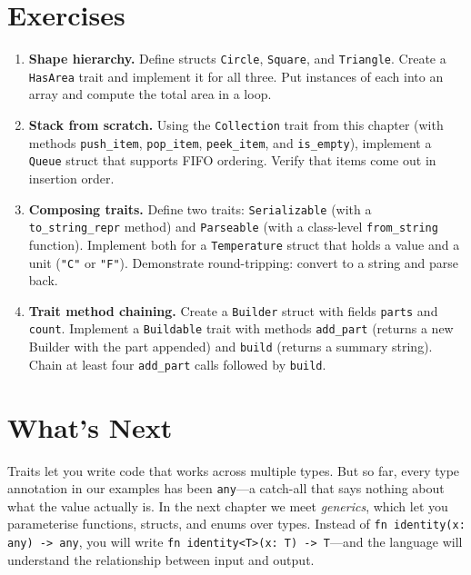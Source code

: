 \section{Exercises}\label{sec:trait-exercises}

\begin{enumerate}
  \item \textbf{Shape hierarchy.}
    Define structs \lstinline|Circle|, \lstinline|Square|, and
    \lstinline|Triangle|. Create a \lstinline|HasArea| trait and implement
    it for all three. Put instances of each into an array and compute the
    total area in a loop.

  \item \textbf{Stack from scratch.}
    Using the \lstinline|Collection| trait from this chapter (with methods
    \lstinline|push_item|, \lstinline|pop_item|, \lstinline|peek_item|,
    and \lstinline|is_empty|), implement a \lstinline|Queue| struct that
    supports FIFO ordering. Verify that items come out in insertion order.

  \item \textbf{Composing traits.}
    Define two traits: \lstinline|Serializable| (with a
    \lstinline|to_string_repr| method) and \lstinline|Parseable| (with a
    class-level \lstinline|from_string| function). Implement both for a
    \lstinline|Temperature| struct that holds a value and a unit
    (\lstinline|"C"| or \lstinline|"F"|). Demonstrate round-tripping:
    convert to a string and parse back.

  \item \textbf{Trait method chaining.}
    Create a \lstinline|Builder| struct with fields \lstinline|parts| and
    \lstinline|count|. Implement a \lstinline|Buildable| trait with methods
    \lstinline|add_part| (returns a new Builder with the part appended) and
    \lstinline|build| (returns a summary string). Chain at least four
    \lstinline|add_part| calls followed by \lstinline|build|.
\end{enumerate}

\section*{What's Next}

Traits let you write code that works across multiple types. But so far,
every type annotation in our examples has been \lstinline|any|---a catch-all
that says nothing about what the value actually is. In the next chapter we
meet \emph{generics}, which let you parameterise functions, structs, and
enums over types. Instead of \lstinline|fn identity(x: any) -> any|, you
will write \lstinline|fn identity<T>(x: T) -> T|---and the language will
understand the relationship between input and output.

